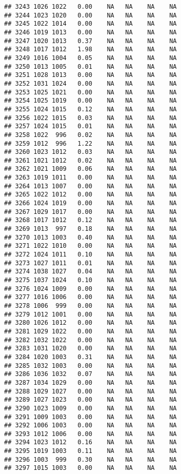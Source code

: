 \documentclass{article}\usepackage{graphicx, color}
\makeatletter
\newenvironment{kframe}{%
 \def\at@end@of@kframe{}%
 \ifinner\ifhmode%
  \def\at@end@of@kframe{\end{minipage}}%
  \begin{minipage}{\columnwidth}%
 \fi\fi%
 \def\FrameCommand##1{\hskip\@totalleftmargin \hskip-\fboxsep
 \colorbox{shadecolor}{##1}\hskip-\fboxsep
     \hskip-\linewidth \hskip-\@totalleftmargin \hskip\columnwidth}%
 \MakeFramed {\advance\hsize-\width
   \@totalleftmargin\z@ \linewidth\hsize
   \@setminipage}}%
 {\par\unskip\endMakeFramed%
 \at@end@of@kframe}
\newenvironment{knitrout}{}{} %
\makeatother
\begin{document}
\begin{knitrout}
\begin{kframe}
\begin{verbatim}
## 3243 1026 1022   0.00    NA   NA    NA    NA
## 3244 1023 1020   0.00    NA   NA    NA    NA
## 3245 1022 1014   0.00    NA   NA    NA    NA
## 3246 1019 1013   0.00    NA   NA    NA    NA
## 3247 1020 1013   0.37    NA   NA    NA    NA
## 3248 1017 1012   1.98    NA   NA    NA    NA
## 3249 1016 1004   0.05    NA   NA    NA    NA
## 3250 1013 1005   0.01    NA   NA    NA    NA
## 3251 1028 1013   0.00    NA   NA    NA    NA
## 3252 1031 1024   0.00    NA   NA    NA    NA
## 3253 1025 1021   0.00    NA   NA    NA    NA
## 3254 1025 1019   0.00    NA   NA    NA    NA
## 3255 1024 1015   0.12    NA   NA    NA    NA
## 3256 1022 1015   0.03    NA   NA    NA    NA
## 3257 1024 1015   0.01    NA   NA    NA    NA
## 3258 1022  996   0.02    NA   NA    NA    NA
## 3259 1012  996   1.22    NA   NA    NA    NA
## 3260 1023 1012   0.03    NA   NA    NA    NA
## 3261 1021 1012   0.02    NA   NA    NA    NA
## 3262 1021 1009   0.06    NA   NA    NA    NA
## 3263 1019 1011   0.00    NA   NA    NA    NA
## 3264 1013 1007   0.00    NA   NA    NA    NA
## 3265 1022 1012   0.00    NA   NA    NA    NA
## 3266 1024 1019   0.00    NA   NA    NA    NA
## 3267 1029 1017   0.00    NA   NA    NA    NA
## 3268 1017 1012   0.12    NA   NA    NA    NA
## 3269 1013  997   0.18    NA   NA    NA    NA
## 3270 1013 1003   0.40    NA   NA    NA    NA
## 3271 1022 1010   0.00    NA   NA    NA    NA
## 3272 1024 1011   0.10    NA   NA    NA    NA
## 3273 1027 1011   0.01    NA   NA    NA    NA
## 3274 1038 1027   0.04    NA   NA    NA    NA
## 3275 1037 1024   0.10    NA   NA    NA    NA
## 3276 1024 1009   0.00    NA   NA    NA    NA
## 3277 1016 1006   0.00    NA   NA    NA    NA
## 3278 1006  999   0.00    NA   NA    NA    NA
## 3279 1012 1001   0.00    NA   NA    NA    NA
## 3280 1026 1012   0.00    NA   NA    NA    NA
## 3281 1029 1022   0.00    NA   NA    NA    NA
## 3282 1032 1022   0.00    NA   NA    NA    NA
## 3283 1031 1020   0.00    NA   NA    NA    NA
## 3284 1020 1003   0.31    NA   NA    NA    NA
## 3285 1032 1003   0.00    NA   NA    NA    NA
## 3286 1036 1032   0.07    NA   NA    NA    NA
## 3287 1034 1029   0.00    NA   NA    NA    NA
## 3288 1029 1027   0.00    NA   NA    NA    NA
## 3289 1027 1023   0.00    NA   NA    NA    NA
## 3290 1023 1009   0.00    NA   NA    NA    NA
## 3291 1009 1003   0.00    NA   NA    NA    NA
## 3292 1006 1003   0.00    NA   NA    NA    NA
## 3293 1012 1006   0.00    NA   NA    NA    NA
## 3294 1023 1012   0.16    NA   NA    NA    NA
## 3295 1019 1003   0.11    NA   NA    NA    NA
## 3296 1003  999   0.30    NA   NA    NA    NA
## 3297 1015 1003   0.00    NA   NA    NA    NA

\end{verbatim}
\end{kframe}
\end{knitrout}
\end{document}
